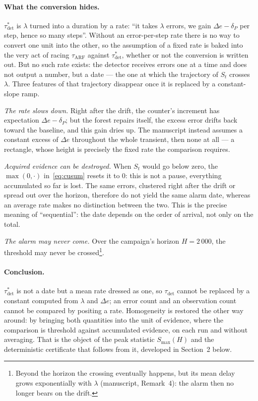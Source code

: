 \documentclass[10pt,a4paper]{article}
\begin{document}
\paragraph{What the conversion hides.} $\tau^*_{\mathrm{det}}$ is $\lambda$ turned into
a duration by a rate: ``it takes $\lambda$ errors, we gain $\Delta e - \delta_P$ per step,
hence so many steps''. Without an error-per-step rate there is no way to convert one unit
into the other, so the assumption of a fixed rate is baked into the very act of racing
$\tau_{\mathrm{ARF}}$ against $\tau^*_{\mathrm{det}}$, whether or not the conversion is
written out. But no such rate exists: the detector receives errors one at a time and does
not output a number, but a date --- the one at which the trajectory of $S_t$ crosses
$\lambda$. Three features of that trajectory disappear once it is replaced by a
constant-slope ramp.

\emph{The rate slows down.} Right after the drift, the counter's increment has
expectation $\Delta e - \delta_P$; but the forest repairs itself, the excess error
drifts back toward the baseline, and this gain dries up. The manuscript instead
assumes a constant excess of $\Delta e$ throughout the whole transient, then none at
all --- a rectangle, whose height is precisely the fixed rate the comparison requires.

\emph{Acquired evidence can be destroyed.} When $S_t$ would go below zero, the
$\max(0,\cdot)$ in~\eqref{eq:cusum} resets it to $0$: this is not a pause, everything
accumulated so far is lost. The same errors, clustered right after the drift or spread
out over the horizon, therefore do not yield the same alarm date, whereas an average
rate makes no distinction between the two. This is the precise meaning of
``sequential'': the date depends on the order of arrival, not only on the total.

\emph{The alarm may never come.} Over the campaign's horizon $H = 2\,000$, the
threshold may never be crossed\footnote{Beyond the horizon the crossing eventually
happens, but its mean delay grows exponentially with $\lambda$ (manuscript,
Remark~4): the alarm then no longer bears on the drift.}.

\paragraph{Conclusion.} $\tau^*_{\mathrm{det}}$ is not a date but a mean rate dressed
as one, so $\tau_{\mathrm{det}}$ cannot be replaced by a constant computed from
$\lambda$ and $\Delta e$; an error count and an observation count cannot be compared by
positing a rate. Homogeneity is restored the other way around: by bringing both
quantities into the unit of evidence, where the comparison is threshold against
accumulated evidence, on each run and without averaging. That is the object of the
peak statistic $S_{\max}(H)$ and the deterministic certificate that follows from it,
developed in Section~2 below.
\end{document}
